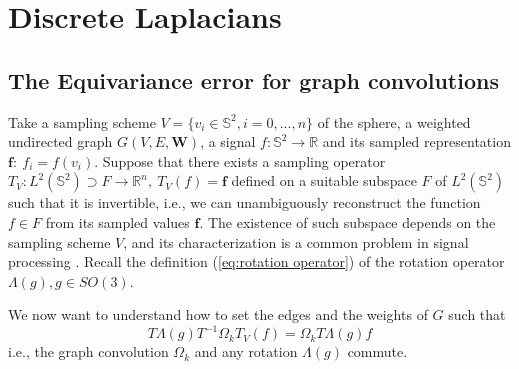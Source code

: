 
\section{Discrete Laplacians}\label{sec:Chapter3: other discrete laplacians}
\subsection{The Equivariance error for graph convolutions}
Take a sampling scheme $V=\{v_i\in\mathbb S^2, i=0, ..., n\}$ of the sphere, a weighted undirected graph $G(V, E, \mathbf W)$, a signal $f: \mathbb S^2\to\mathbb R$ and its sampled representation $\mathbf f:\ f_i=f(v_i)$. Suppose that there exists a sampling operator $T_V: L^2(\mathbb S^2) \supset F\to \mathbb R^n,\  T_V(f) = \mathbf f$ defined on a suitable subspace $F$ of $L^2(\mathbb S^2)$ such that it is invertible, i.e., we can unambiguously reconstruct the function $f\in F$ from its sampled values $\mathbf f$. The existence of such subspace depends on the sampling scheme $V$, and its characterization is a common problem in signal processing \cite{Driscoll:1994:CFT:184069.184073}. Recall the definition (\ref{eq:rotation operator}) of the rotation operator $\Lambda(g), g\in SO(3)$. 

We now want to understand how to set the edges and the weights of $G$ such that
\begin{equation}\label{eq:equivariance}
	T \Lambda(g) T^{-1} \Omega_k T_V(f) = \Omega_k T \Lambda(g) f
\end{equation}
i.e., the graph convolution $\Omega_k$ and any rotation $\Lambda(g)$ commute.
 
